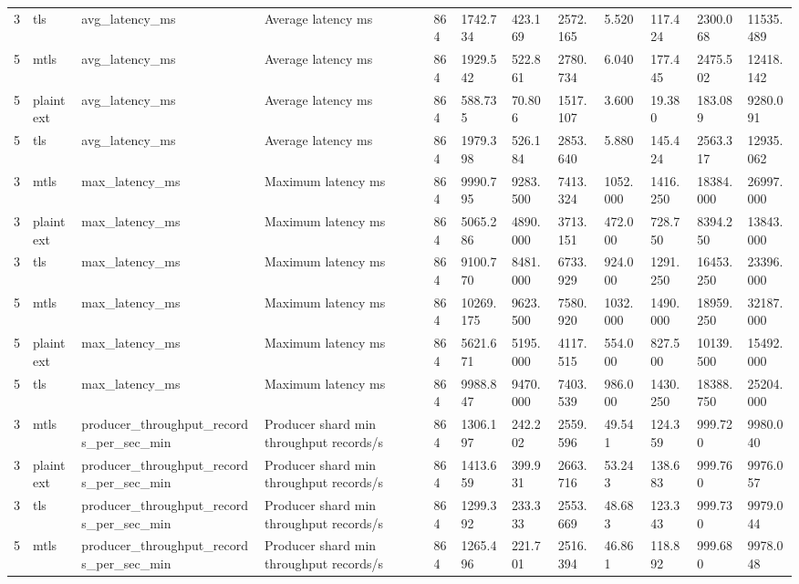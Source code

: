 \begin{longtable}{llllllllllll}
3 & tls & avg\_latency\_ms & Average latency ms & 864 & 1742.734 & 423.169 & 2572.165 & 5.520 & 117.424 & 2300.068 & 11535.489 \\
5 & mtls & avg\_latency\_ms & Average latency ms & 864 & 1929.542 & 522.861 & 2780.734 & 6.040 & 177.445 & 2475.502 & 12418.142 \\
5 & plaintext & avg\_latency\_ms & Average latency ms & 864 & 588.735 & 70.806 & 1517.107 & 3.600 & 19.380 & 183.089 & 9280.091 \\
5 & tls & avg\_latency\_ms & Average latency ms & 864 & 1979.398 & 526.184 & 2853.640 & 5.880 & 145.424 & 2563.317 & 12935.062 \\
3 & mtls & max\_latency\_ms & Maximum latency ms & 864 & 9990.795 & 9283.500 & 7413.324 & 1052.000 & 1416.250 & 18384.000 & 26997.000 \\
3 & plaintext & max\_latency\_ms & Maximum latency ms & 864 & 5065.286 & 4890.000 & 3713.151 & 472.000 & 728.750 & 8394.250 & 13843.000 \\
3 & tls & max\_latency\_ms & Maximum latency ms & 864 & 9100.770 & 8481.000 & 6733.929 & 924.000 & 1291.250 & 16453.250 & 23396.000 \\
5 & mtls & max\_latency\_ms & Maximum latency ms & 864 & 10269.175 & 9623.500 & 7580.920 & 1032.000 & 1490.000 & 18959.250 & 32187.000 \\
5 & plaintext & max\_latency\_ms & Maximum latency ms & 864 & 5621.671 & 5195.000 & 4117.515 & 554.000 & 827.500 & 10139.500 & 15492.000 \\
5 & tls & max\_latency\_ms & Maximum latency ms & 864 & 9988.847 & 9470.000 & 7403.539 & 986.000 & 1430.250 & 18388.750 & 25204.000 \\
3 & mtls & producer\_throughput\_records\_per\_sec\_min & Producer shard min throughput records/s & 864 & 1306.197 & 242.202 & 2559.596 & 49.541 & 124.359 & 999.720 & 9980.040 \\
3 & plaintext & producer\_throughput\_records\_per\_sec\_min & Producer shard min throughput records/s & 864 & 1413.659 & 399.931 & 2663.716 & 53.243 & 138.683 & 999.760 & 9976.057 \\
3 & tls & producer\_throughput\_records\_per\_sec\_min & Producer shard min throughput records/s & 864 & 1299.392 & 233.333 & 2553.669 & 48.683 & 123.343 & 999.730 & 9979.044 \\
5 & mtls & producer\_throughput\_records\_per\_sec\_min & Producer shard min throughput records/s & 864 & 1265.496 & 221.701 & 2516.394 & 46.861 & 118.892 & 999.680 & 9978.048 \\

\end{longtable}
